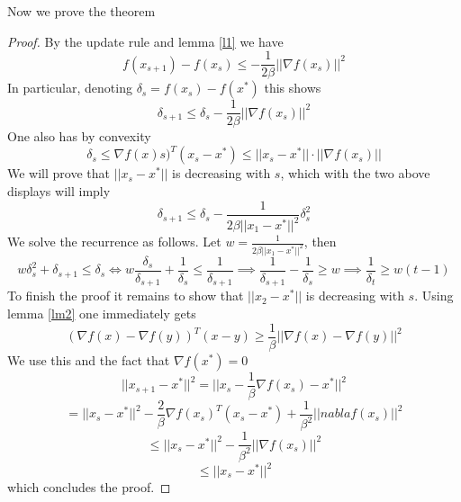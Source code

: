 Now we prove the theorem

\begin{proof}
By the update rule and lemma \ref{l1} we have 
$$f(x_{s+1}) - f(x_s) \leq -\frac{1}{2\beta}||\nabla f(x_s)||^2 $$ 
In particular, denoting $\delta_s = f(x_s) - f(x^*)$ this shows
$$\delta_{s+1} \leq \delta_s - \frac{1}{2\beta}||\nabla f(x_s)||^2 $$
One also has by convexity
$$\delta_s \leq \nabla f(x)s)^T(x_s - x^*) \leq ||x_s - x^*|| \cdot ||\nabla f(x_s)||$$
We will prove that $||x_s - x^*||$ is decreasing with $s$, which with the two above displays will imply 
$$\delta_{s+1}\leq \delta_s - \frac{1}{2\beta||x_1 - x^*||^2}\delta_s^2$$
We solve the recurrence as follows.  Let $w = \frac{1}{2\beta||x_1 - x^*||^2}$, then 
$$w\delta_s^2 + \delta_{s+1} \leq \delta_s \iff w\frac{\delta_s}{\delta_{s+1}} + \frac
{1}{\delta_s} \leq \frac{1}{\delta_{s+1}} \implies \frac{1}{\delta_{s+1}} - \frac{1}{\delta_s} \geq w \implies \frac{1}{\delta_t} \geq w(t-1)$$
To finish the proof it remains to show that $||x_2 - x^*||$ is decreasing with $s$.  Using lemma \ref{lm2} one immediately gets 
$$ (\nabla f(x) - \nabla f(y))^T(x - y) \geq \frac{1}{\beta} ||\nabla f(x) - \nabla f(y)||^2$$
We use this and the fact that $\nabla f(x^*) = 0$
$$||x_{s+1} - x^*||^2 = ||x_s - \frac{1}{\beta}\nabla f(x_s) - x^*||^2$$
$$= ||x_s - x^*||^2 - \frac{2}{\beta}\nabla f(x_s)^T(x_s - x^*) + \frac{1}{\beta^2}||nabla f(x_s)||^2 $$
$$\leq ||x_s - x^*||^2 - \frac{1}{\beta^2} ||\nabla f(x_s)||^2 $$
$$\leq ||x_s - x^*||^2$$
which concludes the proof.  
\end{proof}


